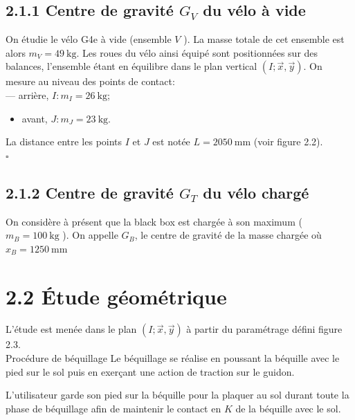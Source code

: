 \subsection*{2.1.1 Centre de gravité \(G_{V}\) du vélo à vide}
On étudie le vélo G4e à vide (ensemble \(V\) ). La masse totale de cet ensemble est alors \(m_{V}=49 \mathrm{~kg}\). Les roues du vélo ainsi équipé sont positionnées sur des balances, l'ensemble étant en équilibre dans le plan vertical \((I ; \vec{x}, \vec{y})\). On mesure au niveau des points de contact:\\
— arrière, \(I: m_{I}=26 \mathrm{~kg}\);

\begin{itemize}
  \item avant, \(J: m_{J}=23 \mathrm{~kg}\).
\end{itemize}

La distance entre les points \(I\) et \(J\) est notée \(L=2050 \mathrm{~mm}\) (voir figure 2.2).\\
\(\square\) 



\subsection*{2.1.2 Centre de gravité \(G_{T}\) du vélo chargé}
On considère à présent que la black box est chargée à son maximum ( \(m_{B}=100 \mathrm{~kg}\) ). On appelle \(G_{B}\), le centre de gravité de la masse chargée où \(x_{B}=1250 \mathrm{~mm}\)


\section*{2.2 Étude géométrique}
L'étude est menée dans le plan \((I ; \vec{x}, \vec{y})\) à partir du paramétrage défini figure 2.3.\\
Procédure de béquillage Le béquillage se réalise en poussant la béquille avec le pied sur le sol puis en exerçant une action de traction sur le guidon.

L'utilisateur garde son pied sur la béquille pour la plaquer au sol durant toute la phase de béquillage afin de maintenir le contact en \(K\) de la béquille avec le sol.


